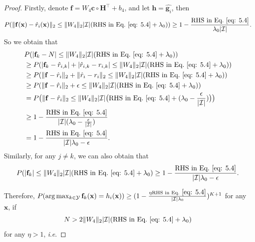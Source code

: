 \documentclass{article}
\theoremstyle{plain}
\theoremstyle{definition}
\theoremstyle{remark}
\begin{document}
\begin{proof}
    Firstly, denote $\mathbf{f} = W_4\mathbf{c} \circ \mathbf{H}^{\top}+b_4$, and let $\mathbf{h}=\hat{\mathbf{g}_i}$, then
    \begin{equation}
        P(\|\mathbf{f}(\mathbf{x})-\hat{r}_i (\mathbf{x})\|_2\leq\|W_4\|_2|\mathcal{I}|(\text{RHS~in~Eq.}~\eqref{eq: 5.4}+\lambda_0))\geq 1 - \frac{\text{RHS~in~Eq.}~\eqref{eq: 5.4}}{\lambda_0|\mathcal{I}|}.
    \end{equation}
    So we obtain that    
    \begin{equation}
    \begin{aligned}
        &P(|\mathbf{f}_k - N|\leq\|W_4\|_2|\mathcal{I}|(\text{RHS~in~Eq.}~\eqref{eq: 5.4}+\lambda_0)) \\
        &\geq P(|\mathbf{f}_k-\hat{r}_{i,k}|+|\hat{r}_{i,k}-r_{i,k}|\leq\|W_4\|_2|\mathcal{I}|(\text{RHS~in~Eq.}~\eqref{eq: 5.4}+\lambda_0)) \\
        &\geq P(\|\mathbf{f}-\hat{r}_i\|_2+\|\hat{r}_i-r_i\|_2\leq\|W_4\|_2|\mathcal{I}|(\text{RHS~in~Eq.}~\eqref{eq: 5.4}+\lambda_0)) \\
        &\geq P(\|\mathbf{f}-\hat{r}_i\|_2+\epsilon \leq\|W_4\|_2|\mathcal{I}|(\text{RHS~in~Eq.}~\eqref{eq: 5.4}+\lambda_0)) \\
        &=P\bigr(\|\mathbf{f}-\hat{r}_i\|_2 \leq\|W_4\|_2|\mathcal{I}|\bigl(\text{RHS~in~Eq.}~\eqref{eq: 5.4}+(\lambda_0-\frac{\epsilon}{|\mathcal{I}|})\bigr)\bigr) \\
        &\geq 1-\frac{\text{RHS~in~Eq.}~\eqref{eq: 5.4}}{|\mathcal{I}|(\lambda_0-\frac{\epsilon}{|\mathcal{I}|})}\\
        &= 1-\frac{\text{RHS~in~Eq.}~\eqref{eq: 5.4}}{|\mathcal{I}|\lambda_0-\epsilon}.
    \end{aligned}
    \end{equation}
    Similarly, for any $j \neq k$, we can also obtain that
    \begin{equation}
        P(|\mathbf{f}_k|\leq\|W_4\|_2|\mathcal{I}|(\text{RHS~in~Eq.}~\eqref{eq: 5.4}+\lambda_0)\geq 1-\frac{\text{RHS~in~Eq.}~\eqref{eq: 5.4}}{|\mathcal{I}|\lambda_0-\epsilon}.
    \end{equation}
    
    Therefore, $P(\arg\max_{k\in \mathcal{Y}}\mathbf{f}_k(\mathbf{x}) = h_i(\mathbf{x}))\geq (1-\frac{\eta \text{RHS~in~Eq.}~\eqref{eq: 5.4}}{|\mathcal{I}|\lambda_0})^{K+1}$ for any $\mathbf{x}$, 
    if 
    \begin{equation}
        N>2\|W_4\|_2|\mathcal{I}|(\text{RHS~in~Eq.}~\eqref{eq: 5.4}+\lambda_0)
    \end{equation}
    for any $\eta>1$, \textit{i}.\textit{e}.
    

\end{proof}
\end{document}
